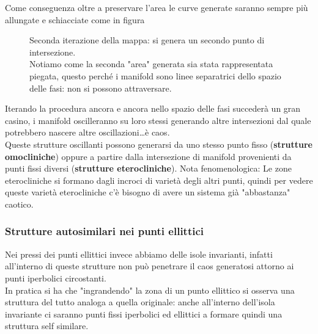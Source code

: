 Come conseguenza oltre a preservare l'area le curve generate saranno sempre più allungate e schiacciate come in figura %
\begin{figure}[H]
    \centering
    \caption{\scriptsize Seconda iterazione della mappa: si genera un secondo punto di intersezione. \\ Notiamo come la seconda "area" generata sia stata rappresentata piegata, questo perché i manifold sono linee separatrici dello spazio delle fasi: non si possono attraversare.}
    \label{fig:19_itero2}
\end{figure}
\noindent
Iterando la procedura ancora e ancora nello spazio delle fasi succederà un gran casino, i manifold oscilleranno su loro stessi generando altre intersezioni dal quale potrebbero nascere altre oscillazioni\ldots è caos.\\
Queste strutture oscillanti possono generarsi da uno stesso punto fisso (\textbf{strutture omocliniche}) oppure a partire dalla intersezione di manifold provenienti da punti fissi diversi (\textbf{strutture eterocliniche}).
Nota fenomenologica: Le zone eterocliniche si formano dagli incroci di varietà degli altri punti, quindi per vedere queste varietà eterocliniche c'è bisogno di avere un sistema già "abbastanza" caotico. 
\subsubsection{Strutture autosimilari nei punti ellittici}%
\label{subsub:Strutture autosimilari nei punti ellittici}
Nei pressi dei punti ellittici invece abbiamo delle isole invarianti, infatti all'interno di queste strutture non può penetrare il caos generatosi attorno ai punti iperbolici circostanti. \\
In pratica si ha che "ingrandendo" la zona di un punto ellittico si osserva una struttura del tutto analoga a quella originale: anche all'interno dell'isola invariante ci saranno punti fissi iperbolici ed ellittici a formare quindi una struttura self similare.
\clearpage
